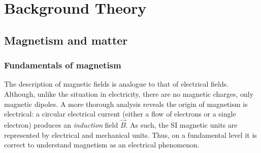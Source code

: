 
\chapter{Background Theory}

\label{ch:background}

\section{Magnetism and matter}

\subsection{Fundamentals of magnetism}

The description of magnetic fields is analogue to that of electrical fields. Although, unlike the situation in electricity, there are no magnetic charges, only magnetic dipoles. A more thorough analysis reveals the origin of magnetism is electrical: a circular electrical current (either a flow of electrons or a single electron) produces an \textit{induction} field $\vec{B}$. As such, the SI magnetic units are represented by electrical and mechanical units. Thus, on a fundamental level it is correct to understand magnetism as an electrical phenomenon.\par

